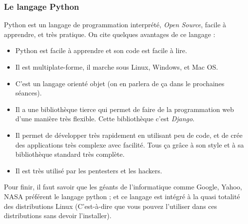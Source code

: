 \documentclass[12pt]{article}
\begin{document}
        \subsubsection{Le langage Python}
            Python est un langage de programmation interprété, \emph{Open Source}, facile à apprendre, 
            et très pratique. On cite quelques avantages de ce langage :
            \begin{itemize}
                \item Python est facile à apprendre et son code est facile à lire.
                \item Il est multiplate-forme, il marche sous Linux, Windows, et Mac OS.
                \item C'est un langage orienté objet (on en parlera de ça dans le prochaines séances).
                \item Il a une bibliothèque tierce qui permet de faire de la programmation web d'une manière très flexible.
                    Cette bibliothèque c'est \emph{Django}.
                \item Il permet de développer très rapidement en utilisant peu de code, et de crée des applications 
                    très complexe avec facilité. Tous ça grâce à son style et à sa bibliothèque standard très complète.
                \item Il est très utilisé par les pentesters et les hackers.
            \end{itemize}

            Pour finir, il faut savoir que les géants de l'informatique comme Google, Yahoo, NASA préférent le langage
            python ; et ce langage est intégré à la quasi totalité des distributions Linux (C'est-à-dire que vous pouvez l'utiliser
            dans ces distributions sans devoir l'installer).

\end{document}
